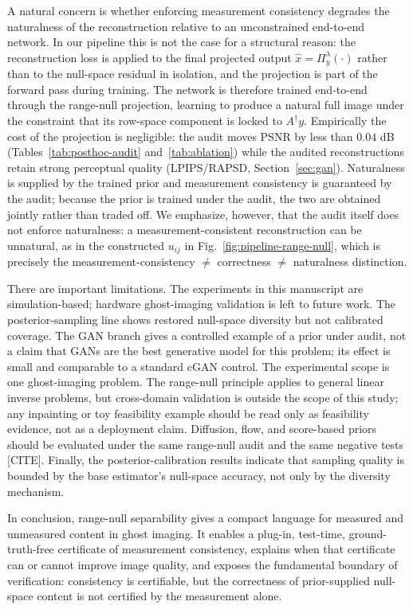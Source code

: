 \documentclass[journal]{IEEEtran}
\newcommand{\pinv}{\dagger}
\newcommand{\Audit}{\Pi_y^\lambda}
\begin{document}
A natural concern is whether enforcing measurement consistency degrades the
naturalness of the reconstruction relative to an unconstrained end-to-end
network.  In our pipeline this is not the case for a structural reason: the
reconstruction loss is applied to the final projected output
$\hat{x}=\Audit(\cdot)$ rather than to the null-space residual in isolation, and
the projection is part of the forward pass during training.  The network is
therefore trained end-to-end through the range-null projection, learning to
produce a natural full image under the constraint that its row-space component is
locked to $A^\pinv y$.  Empirically the cost of the projection is negligible:
the audit moves PSNR by less than $0.04$ dB
(Tables~\ref{tab:posthoc-audit} and~\ref{tab:ablation}) while the audited
reconstructions retain strong perceptual quality (LPIPS/RAPSD,
Section~\ref{sec:gan}).  Naturalness is supplied by the trained prior and
measurement consistency is guaranteed by the audit; because the prior is trained
under the audit, the two are obtained jointly rather than traded off.  We
emphasize, however, that the audit itself does not enforce naturalness: a
measurement-consistent reconstruction can be unnatural, as in the constructed
$u_{ij}$ in Fig.~\ref{fig:pipeline-range-null}, which is precisely the
measurement-consistency $\ne$ correctness $\ne$ naturalness distinction.

There are important limitations.  The experiments in this manuscript are
simulation-based; hardware ghost-imaging validation is left to future work.  The
posterior-sampling line shows restored null-space diversity but not calibrated
coverage.  The GAN branch gives a controlled example of a prior under audit, not
a claim that GANs are the best generative model for this problem; its effect is
small and comparable to a standard cGAN control.  The experimental scope is one
ghost-imaging problem.  The range-null principle applies to general linear
inverse problems, but cross-domain validation is outside the scope of this
study; any inpainting or toy feasibility example should be read only as
feasibility evidence, not as a deployment claim.  Diffusion, flow, and
score-based priors should be evaluated under the same range-null audit and the
same negative tests [CITE].  Finally, the posterior-calibration results indicate
that sampling quality is bounded by the base estimator's null-space accuracy,
not only by the diversity mechanism.

In conclusion, range-null separability gives a compact language for measured and
unmeasured content in ghost imaging.  It enables a plug-in, test-time,
ground-truth-free certificate of measurement consistency, explains when that
certificate can or cannot improve image quality, and exposes the fundamental
boundary of verification: consistency is certifiable, but the correctness of
prior-supplied null-space content is not certified by the measurement alone.
\end{document}
